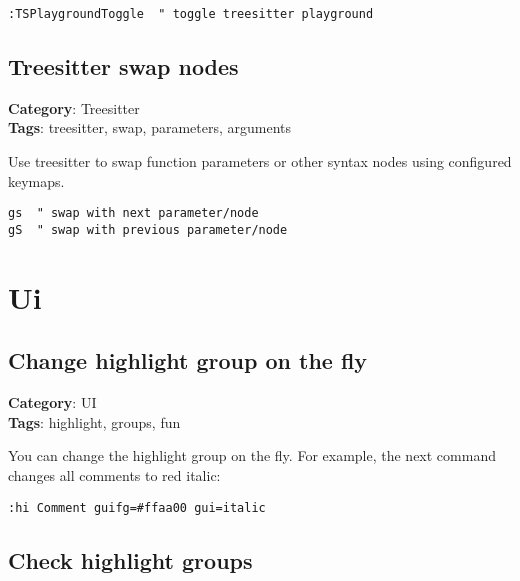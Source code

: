 {{{{{{{{{{{{{{{{{{\begin{Exa*}{}
\begin{Verbatim}[fontsize=\footnotesize, breaklines, breakanywhere]
:TSPlaygroundToggle  " toggle treesitter playground
\end{Verbatim}
\end{Exa*}

\section{Treesitter swap nodes}

\textbf{Category}: Treesitter\\ \textbf{Tags}: treesitter, swap, parameters, arguments
\vspace{0.5cm}

Use treesitter to swap function parameters or other syntax nodes using configured keymaps.

\begin{Exa*}{}
\begin{Verbatim}[fontsize=\footnotesize, breaklines, breakanywhere]
gs  " swap with next parameter/node
gS  " swap with previous parameter/node
\end{Verbatim}
\end{Exa*}

\chapter{Ui}
\section{Change highlight group on the fly}

\textbf{Category}: UI\\ \textbf{Tags}: highlight, groups, fun
\vspace{0.5cm}

You can change the highlight group on the fly. For example, the next command changes all comments to red italic:

\begin{Exa*}{}
\begin{Verbatim}[fontsize=\footnotesize, breaklines, breakanywhere]
:hi Comment guifg=#ffaa00 gui=italic
\end{Verbatim}
\end{Exa*}

\section{Check highlight groups}

}}}}}}}}}}}}}}}}}}
